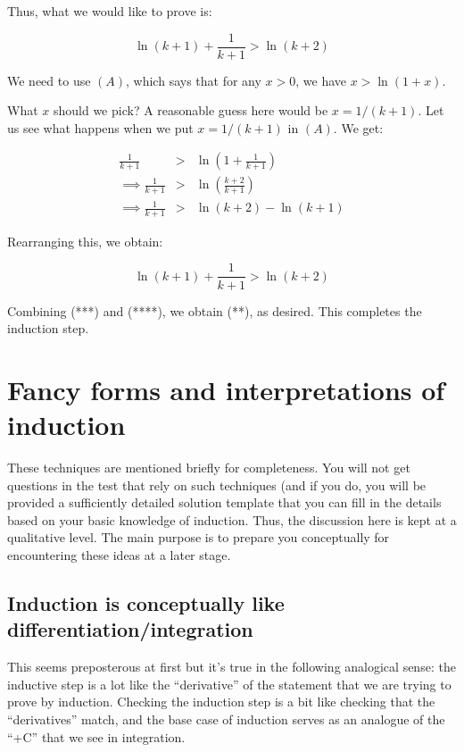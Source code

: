 \documentclass{amsart}
\begin{document}
Thus, what we would like to prove is:

\begin{equation*}
  \ln(k + 1) + \frac{1}{k + 1} > \ln(k + 2)
\end{equation*}

We need to use $(A)$, which says that for any $x > 0$, we have $x >
\ln(1 + x)$.

What $x$ should we pick? A reasonable guess here would be $x = 1/(k +
1)$. Let us see what happens when we put $x = 1/(k + 1)$ in $(A)$. We
get:

\begin{eqnarray*}
  \frac{1}{k + 1} & > & \ln\left(1 + \frac{1}{k + 1}\right) \\
  \implies \frac{1}{k + 1} & > & \ln \left(\frac{k + 2}{k + 1}\right)\\
  \implies \frac{1}{k + 1} & > & \ln(k + 2) - \ln(k + 1)
\end{eqnarray*}

Rearranging this, we obtain:

\begin{equation*}
  \ln(k + 1) + \frac{1}{k + 1} > \ln(k + 2) \tag{****}
\end{equation*}

Combining (***) and (****), we obtain (**), as desired. This
completes the induction step.

\section{Fancy forms and interpretations of induction}

These techniques are mentioned briefly for completeness. You will not
get questions in the test that rely on such techniques (and if you do,
you will be provided a sufficiently detailed solution template that
you can fill in the details based on your basic knowledge of
induction. Thus, the discussion here is kept at a qualitative
level. The main purpose is to prepare you conceptually for
encountering these ideas at a later stage.

\subsection{Induction is conceptually like differentiation/integration}

This seems preposterous at first but it's true in the following
analogical sense: the inductive step is a lot like the ``derivative''
of the statement that we are trying to prove by induction. Checking
the induction step is a bit like checking that the ``derivatives''
match, and the base case of induction serves as an analogue of the
``+C'' that we see in integration.
\end{document}
